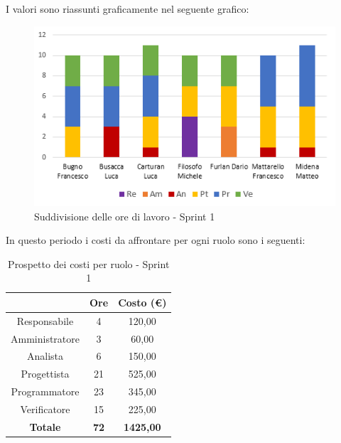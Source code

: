 I valori sono riassunti graficamente nel seguente grafico:

\begin{figure}[H]
  \centering
  \includegraphics[scale=1.0]{immagini/1Sprint_oreLavoro.png}
  \caption{Suddivisione delle ore di lavoro - Sprint 1}
\end{figure}

\pagebreak
In questo periodo i costi da affrontare per ogni ruolo sono i seguenti:

\begin{table}[H]
  \centering
  \renewcommand{\arraystretch}{1.8}
  \begin{tabular}{c|c|c}
    \rowcolor[HTML]{125E28}
    \multicolumn{1}{c}{\color[HTML]{FFFFFF}\textbf{Ruolo}}
                    & \multicolumn{1}{c}{\color[HTML]{FFFFFF}\textbf{Ore}}
                    & \multicolumn{1}{c}{\color[HTML]{FFFFFF}\textbf{Costo (€)}}                    \\
    \hline
    Responsabile    & 4                                                          & 120,00           \\
    Amministratore  & 3                                                          & 60,00            \\
    Analista        & 6                                                          & 150,00           \\
    Progettista     & 21                                                         & 525,00           \\
    Programmatore   & 23                                                         & 345,00           \\
    Verificatore    & 15                                                         & 225,00           \\
    \textbf{Totale} & \textbf{72}                                                & \textbf{1425,00}
  \end{tabular}
  \caption{Prospetto dei costi per ruolo - Sprint 1}
\end{table}


